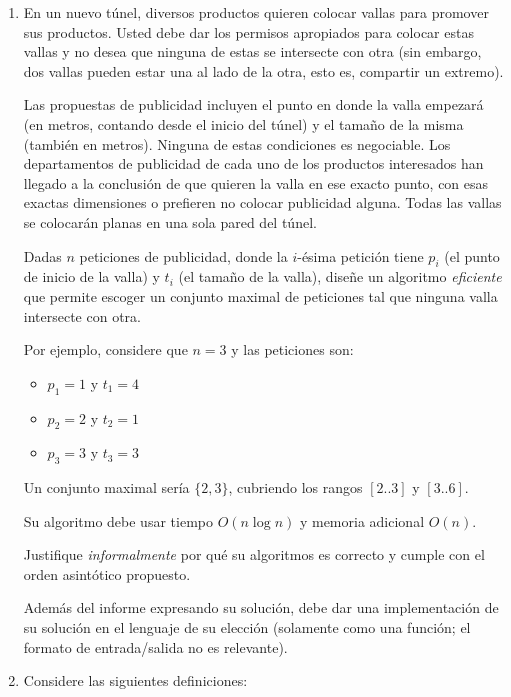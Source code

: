 \documentclass[letterpaper, 12pt]{article}
\begin{document}
\begin{enumerate}


\item  En un nuevo túnel, diversos productos quieren colocar vallas para promover
sus productos. Usted debe dar los permisos apropiados para colocar estas vallas y no desea que ninguna de estas se intersecte con otra (sin embargo, dos vallas pueden estar una al lado de la otra, esto es, compartir un extremo).

Las propuestas de publicidad incluyen el punto en donde la valla empezará (en metros, contando desde el inicio del túnel) y el tamaño de la misma (también en metros). Ninguna de estas condiciones es negociable. Los departamentos de publicidad de cada uno de los productos interesados han llegado a la conclusión de que quieren la valla en ese exacto punto, con esas exactas dimensiones o prefieren no colocar publicidad alguna. Todas las vallas se colocarán planas en una sola pared del túnel.

Dadas $n$ peticiones de publicidad, donde la $i$-ésima petición tiene $p_i$ (el punto de inicio de la valla) y $t_i$ (el tamaño de la valla), diseñe un algoritmo \emph{eficiente} que permite escoger un conjunto maximal de peticiones tal que ninguna valla intersecte con otra.

Por ejemplo, considere que $n = 3$ y las peticiones son:

\begin{itemize}
    \item $p_1 = 1$ y $t_1 = 4$
    \item $p_2 = 2$ y $t_2 = 1$
    \item $p_3 = 3$ y $t_3 = 3$
\end{itemize}

Un conjunto maximal sería $\{2, 3\}$, cubriendo los rangos $[2..3]$ y $[3..6]$.

Su algoritmo debe usar tiempo $O(n\log n)$ y memoria adicional $O(n)$.

Justifique \emph{informalmente} por qué su algoritmos es correcto y cumple con el orden asintótico propuesto.

Además del informe expresando su solución, debe dar una implementación de su solución en el lenguaje de su elección (solamente como una función; el formato de entrada/salida no es relevante).




\item Considere las siguientes definiciones:


\end{enumerate}
\end{document}
